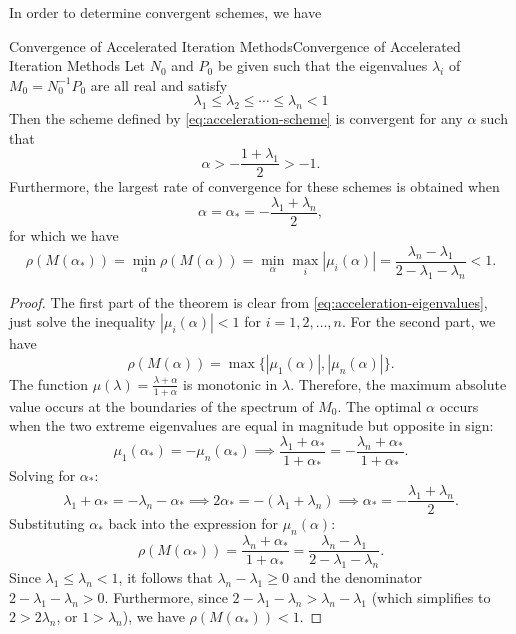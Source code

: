 \documentclass[../main.tex]{subfiles}
\begin{document}
In order to determine convergent schemes, we have
\begin{theorem}{Convergence of Accelerated Iteration Methods}{Convergence of Accelerated Iteration Methods}
	Let $N_0$ and $P_0$ be given such that the eigenvalues $\lambda_i$ of $M_0 = N_0^{-1} P_0$ are all real and satisfy
	\begin{equation*}
		\lambda_1 \leq \lambda_2 \leq \cdots \leq \lambda_n < 1
	\end{equation*}
	Then the scheme defined by \eqref{eq:acceleration-scheme} is convergent for any $\alpha$ such that
	\begin{equation}
		\alpha > - \frac{1 + \lambda_1}{2} > -1.
	\end{equation}
	Furthermore, the largest rate of convergence for these schemes is obtained when
	\begin{equation}
		\alpha = \alpha_* = - \frac{\lambda_1 + \lambda_n}{2},
	\end{equation}
	for which we have
	\begin{equation}
		\rho(M(\alpha_*)) = \min_{\alpha} \rho(M(\alpha)) = \min_{\alpha} \max_i |\mu_i(\alpha)| = \frac{\lambda_n - \lambda_1}{2 - \lambda_1 - \lambda_n} < 1.
	\end{equation}
\end{theorem}
\begin{proof}
	The first part of the theorem is clear from \eqref{eq:acceleration-eigenvalues}, just solve the inequality $|\mu_i(\alpha)| < 1$ for $i = 1, 2, \ldots, n$. For the second part, we have
	\begin{equation*}
		\rho(M(\alpha)) = \max \{ |\mu_1(\alpha)|, |\mu_n(\alpha)| \}.
	\end{equation*}
	The function $\displaystyle \mu(\lambda) = \frac{\lambda + \alpha}{1 + \alpha}$ is monotonic in $\lambda$. Therefore, the maximum absolute value occurs at the boundaries of the spectrum of $M_0$. The optimal $\alpha$ occurs when the two extreme eigenvalues are equal in magnitude but opposite in sign:
	\begin{equation*}
		\mu_1(\alpha_*) = -\mu_n(\alpha_*) \implies \frac{\lambda_1 + \alpha_*}{1 + \alpha_*} = -\frac{\lambda_n + \alpha_*}{1 + \alpha_*}.
	\end{equation*}
	Solving for $\alpha_*$:
	\begin{equation*}
		\lambda_1 + \alpha_* = -\lambda_n - \alpha_* \implies 2\alpha_* = -(\lambda_1 + \lambda_n) \implies \alpha_* = -\frac{\lambda_1 + \lambda_n}{2}.
	\end{equation*}
	Substituting $\alpha_*$ back into the expression for $\mu_n(\alpha)$:
	\begin{equation*}
		\rho(M(\alpha_*)) = \frac{\lambda_n + \alpha_*}{1 + \alpha_*} = \frac{\lambda_n - \lambda_1}{2 - \lambda_1 - \lambda_n}.
	\end{equation*}
	Since $\lambda_1 \leq \lambda_n < 1$, it follows that $\lambda_n - \lambda_1 \geq 0$ and the denominator $2 - \lambda_1 - \lambda_n > 0$. Furthermore, since $2 - \lambda_1 - \lambda_n > \lambda_n - \lambda_1$ (which simplifies to $2 > 2\lambda_n$, or $1 > \lambda_n$), we have $\rho(M(\alpha_*)) < 1$.
\end{proof}
\end{document}

